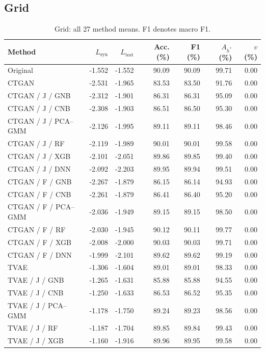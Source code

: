 \documentclass[11pt,letterpaper]{article}
\newcommand{\Lsyn}{L_{\mathrm{syn}}}
\newcommand{\Ltest}{L_{\mathrm{test}}}
\begin{document}
\subsection{Grid}
\begin{table}[H]\centering
\caption{Grid: all 27 method means. F1 denotes macro F1.}\label{tab:all-grid}
\small
\begin{tabular}{lrrrrrr}\toprule
Method & $\Lsyn$ & $\Ltest$ & Acc. (\%) & F1 (\%) & $A_{h^*}$ (\%) & $v$ (\%)\\\midrule
Original & -1.552 & -1.552 & 90.09 & 90.09 & 99.71 & 0.00\\
CTGAN & -2.531 & -1.965 & 83.53 & 83.50 & 91.76 & 0.00\\
CTGAN / J / GNB & -2.312 & -1.901 & 86.31 & 86.31 & 95.09 & 0.00\\
CTGAN / J / CNB & -2.308 & -1.903 & 86.51 & 86.50 & 95.30 & 0.00\\
CTGAN / J / PCA--GMM & -2.126 & -1.995 & 89.11 & 89.11 & 98.46 & 0.00\\
CTGAN / J / RF & -2.119 & -1.989 & 90.01 & 90.01 & 99.58 & 0.00\\
CTGAN / J / XGB & -2.101 & -2.051 & 89.86 & 89.85 & 99.40 & 0.00\\
CTGAN / J / DNN & -2.092 & -2.203 & 89.95 & 89.94 & 99.51 & 0.00\\
CTGAN / F / GNB & -2.267 & -1.879 & 86.15 & 86.14 & 94.93 & 0.00\\
CTGAN / F / CNB & -2.261 & -1.879 & 86.41 & 86.40 & 95.20 & 0.00\\
CTGAN / F / PCA--GMM & -2.036 & -1.949 & 89.15 & 89.15 & 98.50 & 0.00\\
CTGAN / F / RF & -2.030 & -1.945 & 90.12 & 90.11 & 99.77 & 0.00\\
CTGAN / F / XGB & -2.008 & -2.000 & 90.03 & 90.03 & 99.71 & 0.00\\
CTGAN / F / DNN & -1.999 & -2.101 & 89.62 & 89.62 & 99.19 & 0.00\\
TVAE & -1.306 & -1.604 & 89.01 & 89.01 & 98.33 & 0.00\\
TVAE / J / GNB & -1.265 & -1.631 & 85.88 & 85.88 & 94.55 & 0.00\\
TVAE / J / CNB & -1.250 & -1.633 & 86.53 & 86.52 & 95.35 & 0.00\\
TVAE / J / PCA--GMM & -1.178 & -1.750 & 89.24 & 89.23 & 98.56 & 0.00\\
TVAE / J / RF & -1.187 & -1.704 & 89.85 & 89.84 & 99.43 & 0.00\\
TVAE / J / XGB & -1.160 & -1.916 & 89.96 & 89.95 & 99.58 & 0.00\\

\end{tabular}
\end{table}
\end{document}
